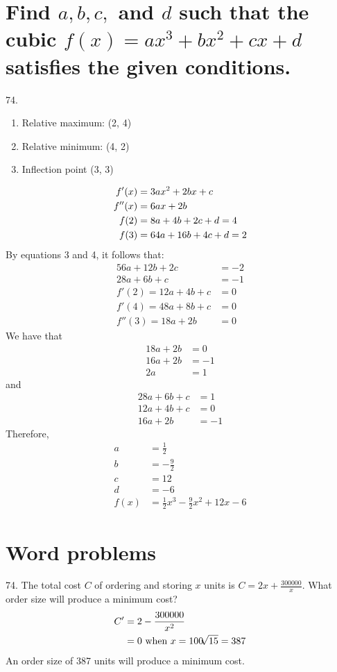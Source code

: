 \documentclass[11pt]{article}
\newcommand*{\set}{\setcounter{equation}{0}}
\begin{document}
\section{Find $a, b, c,$ and $d$ such that the cubic $f(x)=ax^3+bx^2+cx+d$ satisfies the given conditions.}
74.\begin{enumerate}
    \item Relative maximum: (2, 4)
    \item Relative minimum: (4, 2)
    \item Inflection point (3, 3)
\end{enumerate}
\begin{align}
    \set
    f'(x)&=3ax^2+2bx+c\\
    f''(x)&=6ax+2b\\
    f(2)&=8a+4b+2c+d=4\\
    f(3)&=64a+16b+4c+d=2
\end{align}
By equations 3 and 4, it follows that:
\begin{align}
    56a+12b+2c&=-2\\
    28a+6b+c&=-1\\
    f'(2)=12a+4b+c&=0\\
    f'(4)=48a+8b+c&=0\\
    f''(3)=18a+2b&=0
\end{align}
We have that
\begin{align}
    18a+2b&=0\\
    16a+2b&=-1\\
    2a&=1
\end{align}
and
\begin{align}
    28a+6b+c&=1\\
    12a+4b+c&=0\\
    16a+2b&=-1
\end{align}
Therefore,
\begin{align}
    a&=\frac{1}{2}\\
    b&=-\frac{9}{2}\\
    c&=12\\
    d&=-6\\
    f(x)&=\frac{1}{2}x^3-\frac{9}{2}x^2+12x-6
\end{align}

\section{Word problems}
74. The total cost $C$ of ordering and storing $x$ units is $C=2x+\frac{300000}{x}$. What order size will produce a minimum cost?
\begin{align}
    \set
    C'&=2-\frac{300000}{x^2}\\
    &=0\,\,\text{when}\,\, x=100\sqrt[]{15}=387
\end{align}
An order size of 387 units will produce a minimum cost.\\
\end{document}
